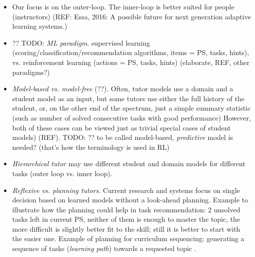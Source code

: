 \begin{itemize}
\item Our focus is on the outer-loop.
  The inner-loop is better suited for people (instructors)
  (REF: Essa, 2016: A possible future for next generation adaptive learning
  systems.)

\item ?? TODO: \emph{ML paradigm}.
supervised learning (scoring/classification/recommendation algorithms, items =
PS, tasks, hints), vs. reinforcement learning (actions = PS, tasks, hints)
\cite{rl-for-tutors-evaluation} (elaborate, REF, other paradigms?)
\item \emph{Model-based vs. model-free} (??).  %
  Often, tutor models use a domain and a student model as an input, but some
  tutors use either the full history of the student, or, on the other end of
  the spectrum, just a simple summary statistic (such as number of solved
  consecutive tasks with good performance) However, both of these cases can be
  viewed just as trivial special cases of student models) (REF).
  TODO: ?? to be called model-based, \emph{predictive} model is needed?
  (that's how the terminology is used in RL)

\item \emph{Hierarchical tutor} may use different student and domain models
  for different tasks (outer loop vs. inner loop).

\item \emph{Reflexive vs. planning tutors}.
Current research and systems focus on single decision based on learned models
without a look-ahead planning.  %
Example to illustrate how the planning could help in task recommendation:
2 unsolved tasks left in current PS, neither of them is enough to master the topic,
the more difficult is slightly better fit to the skill; still it is better to
start with the easier one.
Example of planning for curriculum sequencing: generating a sequence of tasks
(\emph{learning path}) towards a requested topic \cite{its-programming}.


\end{itemize}
